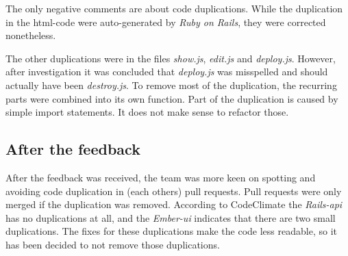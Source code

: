 The only negative comments are about code duplications. While the duplication in the html-code were auto-generated by \textit{Ruby on Rails}, they were corrected nonetheless.

The other duplications were in the files \textit{show.js}, \textit{edit.js} and \textit{deploy.js}. However, after investigation it was concluded that \textit{deploy.js} was misspelled and should actually have been \textit{destroy.js}. To remove most of the duplication, the recurring parts were combined into its own function. Part of the duplication is caused by simple import statements. It does not make sense to refactor those.

\subsection{After the feedback}
After the feedback was received, the team was more keen on spotting and avoiding code duplication in (each others) pull requests. Pull requests were only merged if the duplication was removed. According to CodeClimate the \textit{Rails-api} has no duplications at all, and the \textit{Ember-ui} indicates that there are two small duplications. The fixes for these duplications make the code less readable, so it has been decided to not remove those duplications.





